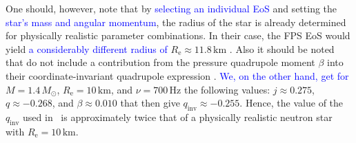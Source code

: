 \documentclass{aa}
\newcommand{\refe}[1]{\textcolor{blue}{{#1}}}
\newcommand{\refedel}[1]{}
\newcommand{\Msun}{\ensuremath{M_{\odot}}}
\newcommand{\qinv}{\ensuremath{q_{\mathrm{inv}}}}
\begin{document}
One should, however, note that by \refe{selecting an individual EoS} and setting the \refe{star's mass and angular momentum}, the radius of the star is already determined for physically realistic parameter combinations.
In their case, the FPS EoS would yield \refe{a considerably different radius of} $R_{\mathrm{e}} \approx 11.8\,\mathrm{km}$ \citep{CST94, LP99}.
Also it should be noted that \citet{BPO13} do not include a contribution from the pressure quadrupole moment $\beta$ into their coordinate-invariant quadrupole expression \citep{PA12}.
\refe{We, on the other hand, get for} $M=1.4\,\Msun$, $R_{\mathrm{e}}=10\,\mathrm{km}$, and $\nu = 700\,\mathrm{Hz}$ the following values: 
$j \approx 0.275$, $q \approx -0.268$, and $\beta \approx 0.010$ that then give $\qinv \approx -0.255$.
Hence, the value of the $\qinv$ used in \citet{BPO13} is approximately twice that of a physically realistic neutron star with $R_{\mathrm{e}} = 10\,\mathrm{km}$.
\end{document}
